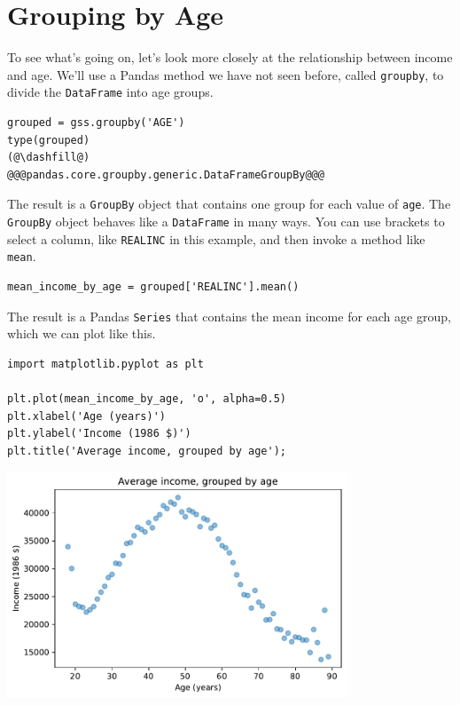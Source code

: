 \hypertarget{grouping-by-age}{%
\section{Grouping by Age}\label{grouping-by-age}}

To see what's going on, let's look more closely at the relationship
between income and age. We'll use a Pandas method we have not seen
before, called \passthrough{\lstinline!groupby!}, to divide the
\passthrough{\lstinline!DataFrame!} into age groups.

\begin{lstlisting}[]
grouped = gss.groupby('AGE')
type(grouped)
(@\dashfill@)
@@@pandas.core.groupby.generic.DataFrameGroupBy@@@
\end{lstlisting}

The result is a \passthrough{\lstinline!GroupBy!} object that contains
one group for each value of \passthrough{\lstinline!age!}. The
\passthrough{\lstinline!GroupBy!} object behaves like a
\passthrough{\lstinline!DataFrame!} in many ways. You can use brackets
to select a column, like \passthrough{\lstinline!REALINC!} in this
example, and then invoke a method like \passthrough{\lstinline!mean!}.

\begin{lstlisting}[]
mean_income_by_age = grouped['REALINC'].mean()
\end{lstlisting}

The result is a Pandas \passthrough{\lstinline!Series!} that contains
the mean income for each age group, which we can plot like this.

\begin{lstlisting}[]
import matplotlib.pyplot as plt

plt.plot(mean_income_by_age, 'o', alpha=0.5)
plt.xlabel('Age (years)')
plt.ylabel('Income (1986 $)')
plt.title('Average income, grouped by age');
\end{lstlisting}

\begin{center}
\includegraphics[width=4in]{chapters/10_regression_files/10_regression_36_0.pdf}
\end{center}

